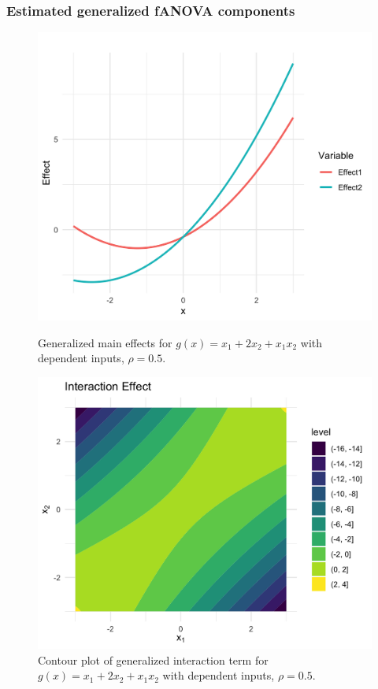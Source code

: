 \subsubsection*{Estimated generalized fANOVA components}
\begin{figure}[htpb]
    \centering
    \begin{minipage}[t]{0.49\textwidth}
        \centering
        \includegraphics[width=\textwidth]{images/gpt_func_main.png}
        \caption{Generalized main effects for $g(x) = x_1 + 2 x_2 + x_1 x_2$ with dependent inputs, $\rho = 0.5$.}
        \label{fig:dep_150_main}
    \end{minipage}%
    \hfill
    \begin{minipage}[t]{0.49\textwidth}
        \centering
        \includegraphics[width=\textwidth]{images/gpt_func_interaction.png}
        \caption{Contour plot of generalized interaction term for $g(x) = x_1 + 2 x_2 + x_1 x_2$ with dependent inputs, $\rho = 0.5$.}
        \label{fig:dep_150_interact}
    \end{minipage}
\end{figure}


